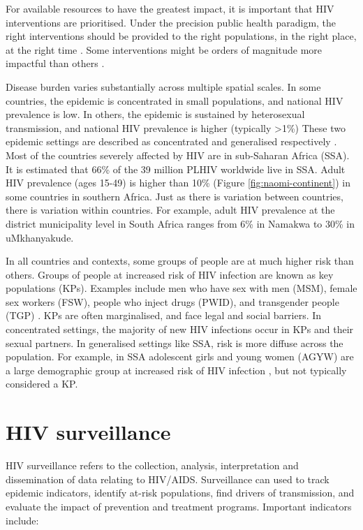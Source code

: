\documentclass[a4paper, nobind]{templates/ociamthesis}
\begin{document}
For available resources to have the greatest impact, it is important that HIV interventions are prioritised.
Under the precision public health paradigm, the right interventions should be provided to the right populations, in the right place, at the right time \autocite{khoury2016precision}.
Some interventions might be orders of magnitude more impactful than others \autocite{ord2013moral}.

Disease burden varies substantially across multiple spatial scales.
In some countries, the epidemic is concentrated in small populations, and national HIV prevalence is low.
In others, the epidemic is sustained by heterosexual transmission, and national HIV prevalence is higher (typically \textgreater1\%)
These two epidemic settings are described as concentrated and generalised respectively \autocite{tanser2014concentrated}.
Most of the countries severely affected by HIV are in sub-Saharan Africa (SSA).
It is estimated that 66\% of the 39 million PLHIV worldwide live in SSA.
Adult HIV prevalence (ages 15-49) is higher than 10\% (Figure \ref{fig:naomi-continent}) in some countries in southern Africa.
Just as there is variation between countries, there is variation within countries.
For example, adult HIV prevalence at the district municipality level in South Africa ranges from 6\% in Namakwa to 30\% in uMkhanyakude.

In all countries and contexts, some groups of people are at much higher risk than others.
Groups of people at increased risk of HIV infection are known as key populations (KPs).
Examples include men who have sex with men (MSM), female sex workers (FSW), people who inject drugs (PWID), and transgender people (TGP) \autocite{stevens2022key}.
KPs are often marginalised, and face legal and social barriers.
In concentrated settings, the majority of new HIV infections occur in KPs and their sexual partners.
In generalised settings like SSA, risk is more diffuse across the population.
For example, in SSA adolescent girls and young women (AGYW) are a large demographic group at increased risk of HIV infection \autocite{risher2021age,monod2023growing}, but not typically considered a KP.

\hypertarget{surveillance}{%
\section{HIV surveillance}\label{surveillance}}

HIV surveillance refers to the collection, analysis, interpretation and dissemination of data relating to HIV/AIDS.
Surveillance can used to track epidemic indicators, identify at-risk populations, find drivers of transmission, and evaluate the impact of prevention and treatment programs.
Important indicators include:
\end{document}
